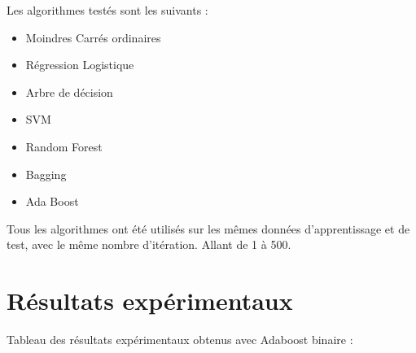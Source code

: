 \documentclass{article}
\begin{document}
Les algorithmes testés sont les suivants :
\begin{itemize}
    \item Moindres Carrés ordinaires 
    \item Régression Logistique
    \item Arbre de décision
    \item SVM
    \item Random Forest
    \item Bagging
    \item Ada Boost
\end{itemize}

Tous les algorithmes ont été utilisés sur les mêmes données d'apprentissage et de test, avec le même nombre d'itération. Allant de 1 à 500.





\section{Résultats expérimentaux}
Tableau des résultats expérimentaux obtenus avec Adaboost binaire :
\end{document}

